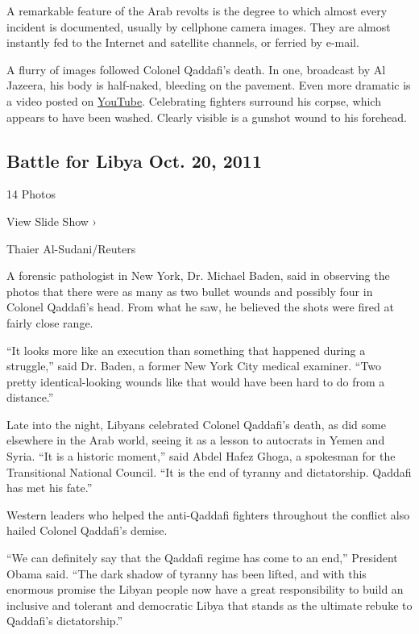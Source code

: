 A remarkable feature of the Arab revolts is the degree to which almost
every incident is documented, usually by cellphone camera images. They
are almost instantly fed to the Internet and satellite channels, or
ferried by e-mail.

A flurry of images followed Colonel Qaddafi's death. In one, broadcast
by Al Jazeera, his body is half-naked, bleeding on the pavement. Even
more dramatic is a video posted on
\href{http://www.youtube.com/watch?v=KEPnIKI3Ivg\&feature=youtu.be\&t=41s\&skipcontrinter=1}{YouTube}.
Celebrating fighters surround his corpse, which appears to have been
washed. Clearly visible is a gunshot wound to his forehead.

\href{https://www.nytimes3xbfgragh.onion/slideshow/2011/10/20/world/africa/20111021-LIBYA.html}{}

\hypertarget{battle-for-libya--oct-20-2011}{%
\subsection{Battle for Libya \textbar{} Oct. 20,
2011}\label{battle-for-libya--oct-20-2011}}

14 Photos

View Slide Show ›

Thaier Al-Sudani/Reuters

A forensic pathologist in New York, Dr. Michael Baden, said in observing
the photos that there were as many as two bullet wounds and possibly
four in Colonel Qaddafi's head. From what he saw, he believed the shots
were fired at fairly close range.

``It looks more like an execution than something that happened during a
struggle,'' said Dr. Baden, a former New York City medical examiner.
``Two pretty identical-looking wounds like that would have been hard to
do from a distance.''

Late into the night, Libyans celebrated Colonel Qaddafi's death, as did
some elsewhere in the Arab world, seeing it as a lesson to autocrats in
Yemen and Syria. ``It is a historic moment,'' said Abdel Hafez Ghoga, a
spokesman for the Transitional National Council. ``It is the end of
tyranny and dictatorship. Qaddafi has met his fate.''

Western leaders who helped the anti-Qaddafi fighters throughout the
conflict also hailed Colonel Qaddafi's demise.

``We can definitely say that the Qaddafi regime has come to an end,''
President Obama said. ``The dark shadow of tyranny has been lifted, and
with this enormous promise the Libyan people now have a great
responsibility to build an inclusive and tolerant and democratic Libya
that stands as the ultimate rebuke to Qaddafi's dictatorship.''

